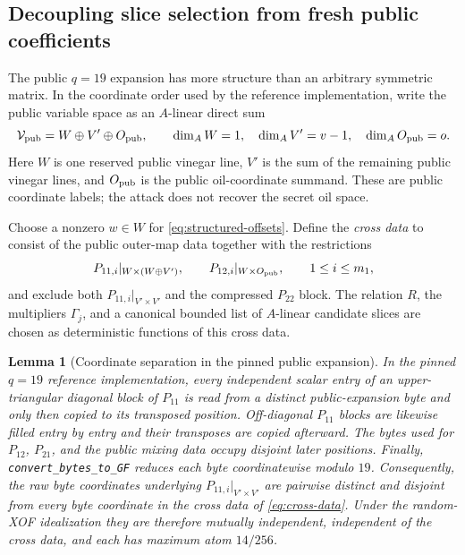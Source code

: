 \documentclass[11pt]{article}
\newtheorem{lemma}[lemma]{Lemma}
\begin{document}
\subsection{Decoupling slice selection from fresh public coefficients}
\label{sec:seeded-decoupling}

The public $q=19$ expansion has more structure than an arbitrary symmetric
matrix.  In the coordinate order used by the reference implementation, write
the public variable space as an $A$-linear direct sum
\begin{equation}\label{eq:public-coordinate-split}
 \mathcal V_{\rm pub}=W\oplus V'\oplus O_{\rm pub},
 \qquad \dim_AW=1,
 \quad \dim_AV'=v-1,
 \quad \dim_AO_{\rm pub}=o.
\end{equation}
Here $W$ is one reserved public vinegar line, $V'$ is the sum of the remaining
public vinegar lines, and $O_{\rm pub}$ is the public oil-coordinate summand.
These are public coordinate labels; the attack does not recover the secret oil
space.

Choose a nonzero $w\in W$ for \eqref{eq:structured-offsets}.  Define the
\emph{cross data} to consist of the public outer-map data together with the
restrictions
\begin{equation}\label{eq:cross-data}
 P_{11,i}|_{W\times(W\oplus V')},
 \qquad
 P_{12,i}|_{W\times O_{\rm pub}},
 \qquad 1\le i\le m_1,
\end{equation}
and exclude both $P_{11,i}|_{V'\times V'}$ and the compressed $P_{22}$ block.
The relation $R$, the multipliers $\Gamma_j$, and a canonical bounded list of
$A$-linear candidate slices are chosen as deterministic functions of this
cross data.

\begin{lemma}[Coordinate separation in the pinned public expansion]
\label{lem:reference-expansion-separation}
In the pinned $q=19$ reference implementation, every independent scalar entry
of an upper-triangular diagonal block of $P_{11}$ is read from a distinct
public-expansion byte and only then copied to its transposed position.
Off-diagonal $P_{11}$ blocks are likewise filled entry by entry and their
transposes are copied afterward.  The bytes used for $P_{12}$, $P_{21}$, and
the public mixing data occupy disjoint later positions.  Finally,
\texttt{convert\_bytes\_to\_GF} reduces each byte coordinatewise modulo $19$.
Consequently, the raw byte coordinates underlying
$P_{11,i}|_{V'\times V'}$ are pairwise distinct and disjoint from every byte
coordinate in the cross data of \eqref{eq:cross-data}.  Under the random-XOF
idealization they are therefore mutually independent, independent of the
cross data, and each has maximum atom $14/256$.
\end{lemma}
\end{document}
